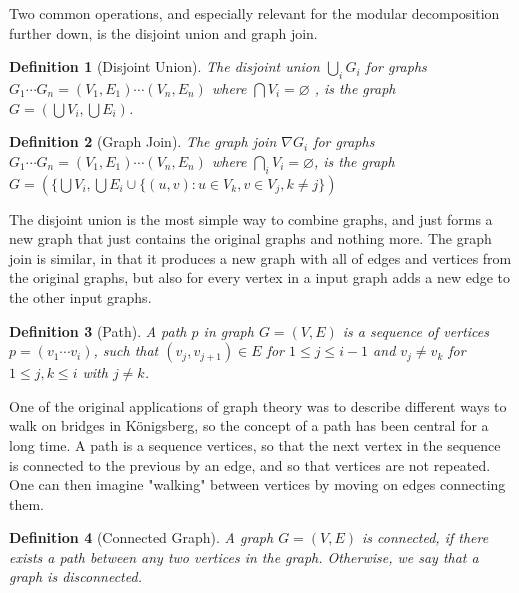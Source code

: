 \documentclass[a4paper]{article}
\newtheorem{definition}{Definition}[section]
\begin{document}
Two common operations, and especially relevant for the modular decomposition
further down, is the disjoint union and graph join.
\begin{definition}[Disjoint Union]
    The disjoint union $\bigcup_i G_i$ for graphs 
    $G_1 \cdots G_n = (V_1,E_1) \cdots (V_n,E_n)$ where 
    $\bigcap V_i = \varnothing $ , is the graph
    $G = \left( \bigcup V_i,\bigcup E_i \right)$.
\end{definition}

\begin{definition}[Graph Join]
    The graph join $\nabla G_i$ for graphs $G_1 \cdots G_n = (V_1,E_1) \cdots (V_n,E_n)$ where 
    $\bigcap_i V_i = \varnothing$, is the graph $G = (\{\bigcup V_i,
    \bigcup E_i \cup \{(u,v) : u \in V_k, v \in V_j, k \neq j \})$
\end{definition}

 The disjoint union is the
most simple way to combine graphs, and just forms a new graph that just
contains the original graphs and nothing more.  The graph join is similar, in
that it produces a new graph with all of edges and vertices from the original
graphs, but also for every vertex in a input graph adds a new edge to the other
input graphs.



\begin{definition}[Path]
    A path $p$ in graph $G = (V,E)$ is a sequence of vertices $p = (v_1\cdots
    v_i)$, such that $(v_j,v_{j+1}) \in E$ for $1 \leq j \leq i-1$ and $v_j \neq v_k$ 
    for $1 \leq j,k \leq i$ with $j \neq k$.
\end{definition}

One of the original applications of graph theory was to describe different ways
to walk on bridges in Königsberg, so the concept of a path has been central for
a long time.  A path is a sequence vertices, so that the next vertex in the
sequence is connected to the previous by an edge, and so that vertices are not
repeated.  One can then imagine "walking" between vertices by moving on edges
connecting them.  


\begin{definition}[Connected Graph]
    A graph $G = (V,E)$ is connected, if there exists a path between any two
    vertices in the graph. Otherwise, we say that a graph is disconnected.
\end{definition}
\end{document}
